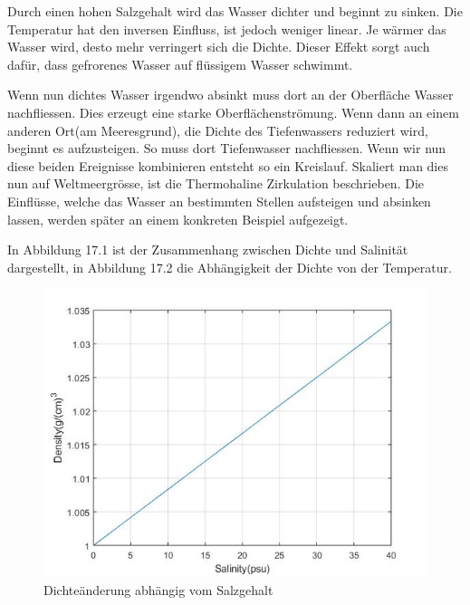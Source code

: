 Durch einen hohen Salzgehalt wird das Wasser dichter und beginnt zu sinken. Die Temperatur hat den inversen Einfluss, ist jedoch weniger linear. Je wärmer das Wasser wird, desto mehr verringert sich die Dichte. Dieser Effekt sorgt auch dafür, dass gefrorenes Wasser auf flüssigem Wasser schwimmt.

Wenn nun dichtes Wasser irgendwo absinkt muss dort an der Oberfläche Wasser nachfliessen. Dies erzeugt eine starke Oberflächenströmung. Wenn dann an einem anderen Ort(am Meeresgrund), die Dichte des Tiefenwassers reduziert wird, beginnt es aufzusteigen. So muss dort Tiefenwasser nachfliessen. Wenn wir nun diese beiden Ereignisse kombinieren entsteht so ein Kreislauf. Skaliert man dies nun auf Weltmeergrösse, ist die Thermohaline Zirkulation beschrieben. Die Einflüsse, welche das Wasser an bestimmten Stellen aufsteigen und absinken lassen, werden später an einem konkreten Beispiel aufgezeigt.

In Abbildung 17.1 ist der Zusammenhang zwischen Dichte und Salinität dargestellt, in Abbildung 17.2 die Abhängigkeit der Dichte von der Temperatur.


\begin{figure}
	\centering
\includegraphics[width=12cm]{thermohalin/Code/graphs/graph_salinity.jpg}
\caption{Dichteänderung abhängig vom Salzgehalt}
\end{figure}

